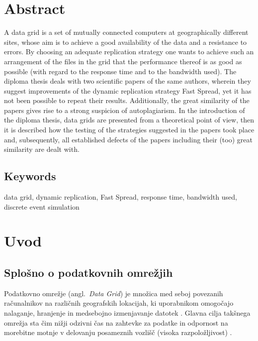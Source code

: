 \documentclass[a4paper, 12pt]{book}
\newcommand{\clearemptydoublepage}{
	\newpage{\pagestyle{empty}\cleardoublepage}}
\begin{document}
\chapter*{Abstract}

A data grid is a set of mutually connected computers at geographically
different sites, whose aim is to achieve a good availability of the data
and a resistance to errors. By choosing an adequate replication strategy one
wants to achieve such an arrangement of the files in the grid that the
performance thereof is as good as possible (with regard to the response time
and to the bandwidth used). The diploma thesis deals with two scientific papers
of the same authors, wherein they suggest improvements of the dynamic
replication strategy Fast Spread, yet it has not been possible to repeat their
results. Additionally, the great similarity of the papers gives rise to a
strong suspicion of autoplagiarism. In the introduction of the diploma thesis,
data grids are presented from a theoretical point of view, then it is
described how the testing of the strategies suggested in the papers took place
and, subsequently, all established defects of the papers including their (too)
great similarity are dealt with.

\section*{Keywords}
data grid, dynamic replication, Fast Spread, response time, bandwidth used,
discrete event simulation


\clearemptydoublepage


\mainmatter
\setcounter{page}{1}
\pagestyle{fancy}

\chapter{Uvod}

\section{Splošno o podatkovnih omrežjih}

Podatkovno omrežje (angl.~\textit{Data Grid}) je množica med seboj
povezanih ra\-ču\-nal\-ni\-kov na različnih geografskih lokacijah, ki
uporabnikom omogočajo nalaganje, hranjenje in medsebojno izmenjavanje datotek
\cite{dgrid_def}. Glavna cilja takšnega omrežja sta čim nižji odzivni čas na
zahtevke za podatke in odpornost na morebitne motnje v delovanju posameznih
vozlišč (visoka razpoložljivost) \cite{dgrid_goals}.
\end{document}
